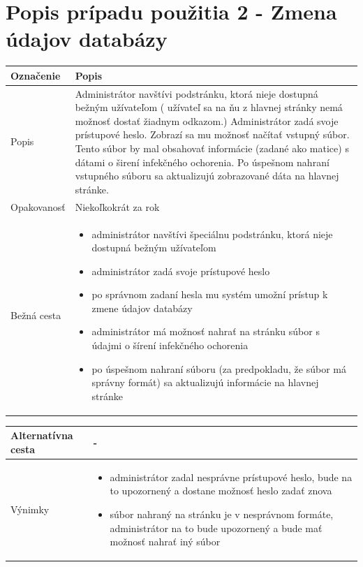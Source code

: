 \documentclass[12pt,a4paper]{report}
\begin{document}
\section[Popis prípadu použitia 2 - Zmena údajov databázy]{\rmfamily\bfseries
	Popis prípadu použitia 2 - Zmena údajov databázy}
\begin{table}[h!]
	\centering
	\begin{tabular}{|>{\centering\arraybackslash}m{3in}|>{\centering\arraybackslash}m{3in}|}
		\hline
		\centering Označenie & Popis \\ [0ex]
		\hline
		Popis & Administrátor navštívi podstránku, ktorá nieje dostupná bežným užívateľom (
		užívateľ sa na ňu z hlavnej stránky nemá možnosť dostať žiadnym odkazom.) Administrátor
		zadá svoje prístupové heslo. Zobrazí sa mu možnosť načítať vstupný súbor. Tento
		súbor by mal obsahovať informácie (zadané ako matice) s dátami o širení infekčného
		ochorenia. Po úspešnom nahraní vstupného súboru sa aktualizujú zobrazované
		dáta na hlavnej stránke.\\ [0ex]
		\hline
		Opakovanosť & Niekoľkokrát za rok \\ [0ex]
		\hline
		Bežná cesta & 	\begin{itemize}
			\item administrátor navštívi špeciálnu podstránku, ktorá nieje dostupná bežným užívateľom
			\item administrátor zadá svoje prístupové heslo
			\item po správnom zadaní hesla mu systém umožní prístup k zmene údajov databázy
			\item administrátor má možnosť nahrať na stránku súbor s údajmi o šírení infekčného ochorenia
			\item po úspešnom nahraní súboru (za predpokladu, že súbor má správny formát) sa aktualizujú informácie na hlavnej stránke
		\end{itemize} \\ [0ex]
		\hline
	\end{tabular}
\end{table}
\begin{table}[h!]
	\centering
	\begin{tabular}{|>{\centering\arraybackslash}m{3in}|>{\centering\arraybackslash}m{3in}|}
		\hline
		Alternatívna cesta & - \\ [0ex]
		\hline
		Výnimky &\begin{itemize}
			\item administrátor zadal nesprávne prístupové heslo, bude na to upozornený a dostane možnosť heslo zadať znova
			\item súbor nahraný na stránku je v nesprávnom formáte, administrátor na to bude upozornený a bude mať možnosť nahrať iný súbor
		\end{itemize} \\ [0ex]
		\hline
	\end{tabular}
\end{table}
\end{document}
